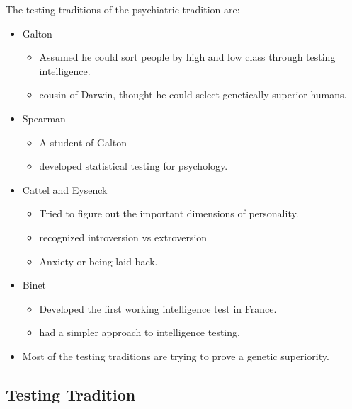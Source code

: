 \documentclass[12pt]{article}
\begin{document}
The testing traditions of the psychiatric tradition are:
\begin{itemize}
    \item Galton
        \begin{itemize}
            \item Assumed he could sort people by high and low class through
                testing intelligence.
            \item cousin of Darwin, thought he could select genetically superior
                humans.
        \end{itemize}
    \item Spearman
        \begin{itemize}
            \item A student of Galton
            \item developed statistical testing for psychology.
        \end{itemize}
    \item Cattel and Eysenck
        \begin{itemize}
            \item Tried to figure out the important dimensions of personality.
            \item recognized introversion vs extroversion
            \item Anxiety or being laid back.
        \end{itemize}
    \item Binet
        \begin{itemize}
            \item Developed the first working intelligence test in France.
            \item had a simpler approach to intelligence testing.
        \end{itemize}
    \item Most of the testing traditions are trying to prove a genetic
        superiority.
\end{itemize}

\subsection*{Testing Tradition}
\end{document}
